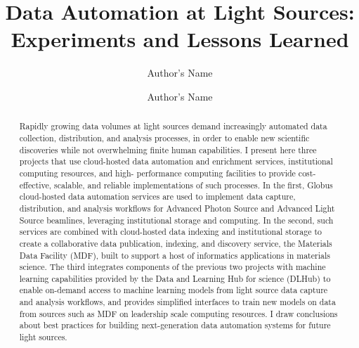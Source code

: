 \documentclass{aip-cp}
\newcommand\ian[1]{}
\newcommand\ian[1]{{\color{red}[Ian: #1]}}
\begin{document}
\title{Data Automation at Light Sources:\\Experiments and Lessons Learned\ian{more exciting title needed}}

\author[aff1,aff2]{Author's Name}
\author[aff2]{Author's Name}


\maketitle


\begin{abstract}
Rapidly growing data volumes at light sources demand increasingly automated data collection, distribution, and analysis processes, in order to enable new scientific discoveries while not overwhelming finite human capabilities. I present here three projects that use cloud-hosted data automation and enrichment services, institutional computing resources, and high- performance computing facilities to provide cost-effective, scalable, and reliable implementations of such processes. In the first, Globus cloud-hosted data automation services are used to implement data capture, distribution, and analysis workflows for Advanced Photon Source and Advanced Light Source beamlines, leveraging institutional storage and computing. In the second, such services are combined with cloud-hosted data indexing and institutional storage to create a collaborative data publication, indexing, and discovery service, the Materials Data Facility (MDF), built to support a host of informatics applications in materials science. The third integrates components of the previous two projects with machine learning capabilities provided by the Data and Learning Hub for science (DLHub) to enable on-demand access to machine learning models from light source data capture and analysis workflows, and provides simplified interfaces to train new models on data from sources such as MDF on leadership scale computing resources. I draw conclusions about best practices for building next-generation data automation systems for future light sources.
\end{abstract}
\end{document}
